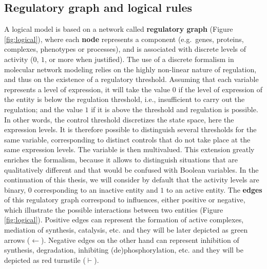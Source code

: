 \documentclass[a4paper,12pt,twoside,onecolumn,openright,final,oldfontcommands]{memoir}
\begin{document}
\subsection{Regulatory graph and logical
rules}\label{regulatory-graph-and-logical-rules}

A logical model is based on a network called \textbf{regulatory graph}
(Figure \ref{fig:logical}), where each \textbf{node} represents a
component (e.g.~genes, proteins, complexes, phenotypes or processes),
and is associated with discrete levels of activity (\(0\), \(1\), or
more when justified). The use of a discrete formalism in molecular
network modeling relies on the highly non-linear nature of regulation,
and thus on the existence of a regulatory threshold. Assuming that each
variable represents a level of expression, it will take the value \(0\)
if the level of expression of the entity is below the regulation
threshold, i.e., insufficient to carry out the regulation; and the value
\(1\) if it is above the threshold and regulation is possible. In other
words, the control threshold discretizes the state space, here the
expression levels. It is therefore possible to distinguish several
thresholds for the same variable, corresponding to distinct controls
that do not take place at the same expression levels. The variable is
then multivalued. This extension greatly enriches the formalism, because
it allows to distinguish situations that are qualitatively different and
that would be confused with Boolean variables. In the continuation of
this thesis, we will consider by default that the activity levels are
binary, \(0\) corresponding to an inactive entity and \(1\) to an active
entity. The \textbf{edges} of this regulatory graph correspond to
influences, either positive or negative, which illustrate the possible
interactions between two entities (Figure \ref{fig:logical}). Positive
edges can represent the formation of active complexes, mediation of
synthesis, catalysis, etc. and they will be later depicted as green
arrows (\(\leftarrow\)). Negative edges on the other hand can represent
inhibition of synthesis, degradation, inhibiting (de)phosphorylation,
etc. and they will be depicted as red turnstile (\(\vdash\)).
\end{document}
